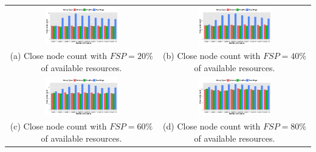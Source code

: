 \documentclass{acm_proc_article-sp}
\begin{document}
\begin{table}[t]
  \centering
  \begin{tabular}{cc}
     \includegraphics[width=0.5\textwidth]{figuresPng/fsTwentyPerc.png} &  \includegraphics[width=0.5\textwidth]{figuresPng/fsFourtyPerc.png}\\ 
     (a) Close node count with $FSP = 20\%$ of available resources. & (b) Close node count with $FSP = 40\%$ of available resources.\\
     \includegraphics[width=0.5\textwidth]{figuresPng/fsSixtyPerc.png} &  \includegraphics[width=0.5\textwidth]{figuresPng/fsEightyPerc.png}\\
       (c) Close node count with $FSP = 60\%$ of available resources. & (d) Close node count with $FSP = 80\%$ of available resources.\\
  \end{tabular}
\label{fig:clusteredResults}
\end{table}
\end{document}
